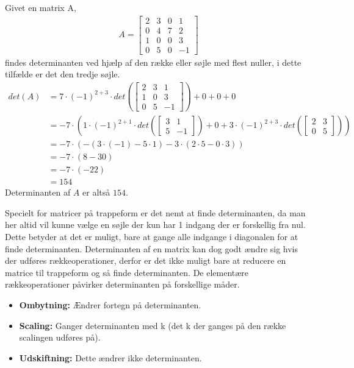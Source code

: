 \begin{eks}
Givet en matrix A,
\begin{align*}
A=\begin{bmatrix}
2 & 3 & 0 & 1 \\
0 & 4 & 7 & 2 \\
1 & 0 & 0 & 3 \\
0 & 5 & 0 & -1
\end{bmatrix}
\end{align*}
findes determinanten ved hjælp af den række eller søjle med flest nuller, i dette tilfælde er det den tredje søjle.
\begin{align*}
det(A)&= 7 \cdot (-1)^{2+3} \cdot det \left( \begin{bmatrix}
2 & 3 & 1 \\
1 & 0 & 3 \\
0 & 5 & -1
\end{bmatrix} \right)+0+0+0 \\
&= -7 \cdot \left( 1 \cdot (-1)^{2+1} \cdot det \left(
\begin{bmatrix}
3 & 1 \\
5 & -1
\end{bmatrix} \right) + 0 + 3 \cdot (-1)^{2+3} \cdot det \left( 
\begin{bmatrix}
2 & 3 \\
0 & 5
\end{bmatrix} \right) \right) \\
&= -7 \cdot (-(3 \cdot (-1)-5 \cdot 1)-3 \cdot(2 \cdot 5 - 0 \cdot 3)) \\
&= -7 \cdot (8-30) \\
&= -7 \cdot (-22) \\
&= 154
\end{align*}
Determinanten af $A$ er altså $154$.
\end{eks}

Specielt for matricer på trappeform er det nemt at finde determinanten, da man her altid vil kunne vælge en søjle der kun har 1 indgang der er forskellig fra nul. 
Dette betyder at det er muligt, bare at gange alle indgange i diagonalen for at finde determinanten. 
Determinanten af en matrix kan dog godt ændre sig hvis der udføres rækkeoperationer, derfor er det ikke muligt bare at reducere en matrice til trappeform og så finde determinanten. 
De elementære rækkeoperationer påvirker determinanten på forskellige måder. 

\begin{stn}
\begin{itemize}
\item \textbf{Ombytning:} Ændrer fortegn på determinanten. 
\item \textbf{Scaling:} Ganger determinanten med k (det k der ganges på den række scalingen udføres på).
\item \textbf{Udskiftning:} Dette ændrer ikke determinanten.
\end{itemize}
\end{stn}

